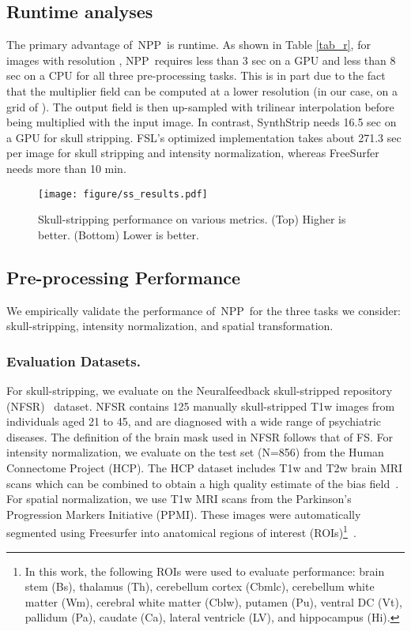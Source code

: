 \documentclass[runningheads]{llncs}
\newcommand{\modelname}{NPP}
\begin{document}
\subsection{Runtime analyses}

The primary advantage of~\modelname~is runtime. 
As shown in Table \ref{tab_r}, for images with resolution , \modelname~requires less than 3 sec on a GPU and less than 8 sec on a CPU for all three pre-processing tasks. 
This is in part due to the fact that the multiplier field can be computed at a lower resolution (in our case, on a grid of ). 
The output field is then up-sampled with trilinear interpolation before being multiplied with the input image. 
In contrast, SynthStrip needs 16.5 sec on a GPU for skull stripping. 
FSL's optimized implementation takes about 271.3 sec per image for skull stripping and intensity normalization, whereas FreeSurfer needs more than 10 min.

\begin{figure}[t]
\centering
\texttt{[image: figure/ss\_results.pdf]}
\caption{Skull-stripping performance on various metrics. (Top) Higher is better. (Bottom) Lower is better.} \label{fig_sr} 
\end{figure}
\subsection{Pre-processing Performance}
We empirically validate the performance of~\modelname~for the three tasks we consider: skull-stripping, intensity normalization, and spatial transformation. 

\subsubsection{Evaluation Datasets.}
For skull-stripping, we evaluate on the Neuralfeedback skull-stripped repository (NFSR)~\cite{Eskildsen2012} dataset. 
NFSR contains 125 manually skull-stripped T1w images from individuals aged 21 to 45, and are diagnosed with a wide range of psychiatric diseases. The definition of the brain mask used in NFSR follows that of FS.  
For intensity normalization, we evaluate on the test set (N=856) from the Human Connectome Project (HCP). 
The HCP dataset includes T1w and T2w brain MRI scans which can be combined to obtain a high quality estimate of the bias field~\cite{Song2022,Glasser2013}.
For spatial normalization, we use T1w MRI scans from the Parkinson's Progression Markers Initiative (PPMI). These images were automatically segmented using Freesurfer into anatomical regions of interest (ROIs)\footnote{
In this work, the following ROIs were used to evaluate performance: brain stem (Bs), thalamus (Th), cerebellum cortex (Cbmlc), cerebellum white matter (Wm), cerebral white matter (Cblw), putamen (Pu), ventral DC (Vt), pallidum (Pa), caudate (Ca), lateral ventricle (LV), and hippocampus (Hi).}~\cite{dalca2018anatomical}.
\end{document}

